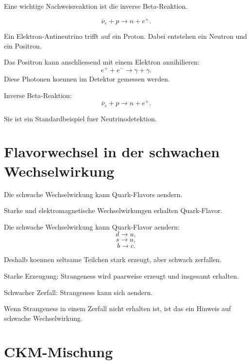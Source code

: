 Eine wichtige Nachweisreaktion ist die inverse Beta-Reaktion.

\begin{formulabox}
\[
    \overline{\nu}_e + p \rightarrow n + e^+.
\]
\end{formulabox}

\begin{conceptbox}
Ein Elektron-Antineutrino trifft auf ein Proton.
Dabei entstehen ein Neutron und ein Positron.

Das Positron kann anschliessend mit einem Elektron annihilieren:
\[
    e^+ + e^- \rightarrow \gamma+\gamma.
\]
Diese Photonen koennen im Detektor gemessen werden.
\end{conceptbox}

\begin{examtipbox}
Inverse Beta-Reaktion:
\[
    \overline{\nu}_e + p \rightarrow n + e^+.
\]

Sie ist ein Standardbeispiel fuer Neutrinodetektion.
\end{examtipbox}

\section{Flavorwechsel in der schwachen Wechselwirkung}

Die schwache Wechselwirkung kann Quark-Flavors aendern.

\begin{conceptbox}
Starke und elektromagnetische Wechselwirkungen erhalten Quark-Flavor.

Die schwache Wechselwirkung kann Quark-Flavor aendern:
\[
    d \rightarrow u,
\]
\[
    s \rightarrow u,
\]
\[
    b \rightarrow c.
\]
\end{conceptbox}

\begin{notebox}
Deshalb koennen seltsame Teilchen stark erzeugt, aber schwach zerfallen.

Starke Erzeugung:
Strangeness wird paarweise erzeugt und insgesamt erhalten.

Schwacher Zerfall:
Strangeness kann sich aendern.
\end{notebox}

\begin{examtipbox}
Wenn Strangeness in einem Zerfall nicht erhalten ist, ist das ein Hinweis auf
schwache Wechselwirkung.
\end{examtipbox}

\section{CKM-Mischung}

